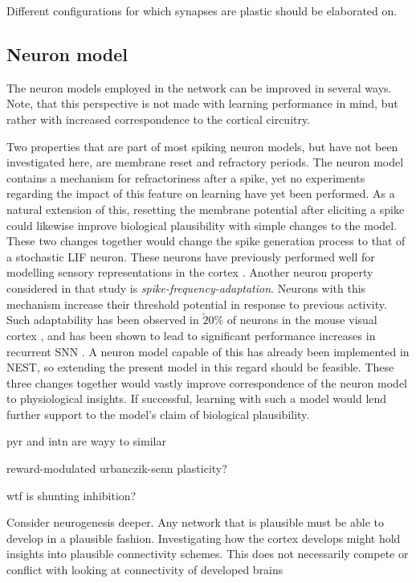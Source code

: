 Different configurations for which synapses are plastic should be elaborated on.


\subsection{Neuron model}


The neuron models employed in the network can be improved in several ways. Note, that this perspective is not made with
learning performance in mind, but rather with increased correspondence to the cortical circuitry.



Two properties that are part of most spiking neuron models, but have not been investigated here, are membrane reset and
refractory periods. The neuron model contains a mechanism for refractoriness after a spike, yet no experiments regarding
the impact of this feature on learning have yet been performed. As a natural extension of this, resetting the membrane
potential after eliciting a spike could likewise improve biological plausibility with simple changes to the model. These
two changes together would change the spike generation process to that of a stochastic LIF neuron. These neurons have
previously performed well for modelling sensory representations in the cortex \citep{Pillow2008}. Another neuron
property considered in that study is \textit{spike-frequency-adaptation}. Neurons with this mechanism increase their
threshold potential in response to previous activity. Such adaptability has been observed in $\tilde 20 \% $ of neurons
in the mouse visual cortex \citep{allen2018}, and has been shown to lead to significant performance increases in
recurrent SNN \citep{bellec2018long,bellec2020solution}. A neuron model capable of this has already been implemented in
NEST, so extending the present model in this regard should be feasible. These three changes together would vastly
improve correspondence of the neuron model to physiological insights. If successful, learning with such a model would
lend further support to the model's claim of biological plausibility.






pyr and intn are wayy to similar

reward-modulated urbanczik-senn plasticity?

wtf is shunting inhibition?

Consider neurogenesis deeper. Any network that is plausible must be able to develop in a plausible fashion. Investigating
how the cortex develops might hold insights into plausible connectivity schemes. This does not necessarily compete or
conflict with looking at connectivity of developed brains



